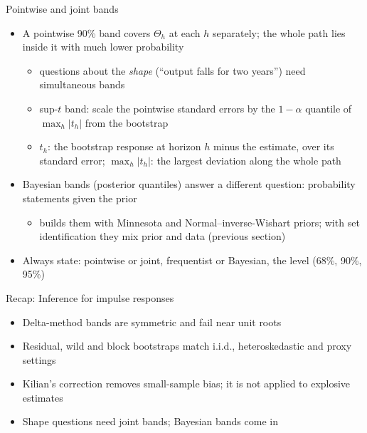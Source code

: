 \begin{frame}{Pointwise and joint bands}
\itemsize{\small}
\begin{itemize}
    \item A pointwise 90\% band covers $\Theta_h$ at each $h$ separately; the whole path lies inside it with much lower probability
    \begin{itemize}
        \item questions about the \emph{shape} (``output falls for two years'') need simultaneous bands 
        \item sup-$t$ band: scale the pointwise standard errors by the $1 - \alpha$ quantile of $\max_h|t_h|$ from the bootstrap
        \item $t_h$: the bootstrap response at horizon $h$ minus the estimate, over its standard error; $\max_h|t_h|$: the largest deviation along the whole path
    \end{itemize}
    \item Bayesian bands (posterior quantiles) answer a different question: probability statements given the prior
    \begin{itemize}
        \item {} builds them with Minnesota and Normal--inverse-Wishart priors; with set identification they mix prior and data (previous section)
    \end{itemize}
    \item Always state: pointwise or joint, frequentist or Bayesian, the level (68\%, 90\%, 95\%)
\end{itemize}
\end{frame}

\begin{frame}{Recap: Inference for impulse responses}
\itemsize{\small}
\begin{itemize}
    \item Delta-method bands are symmetric and fail near unit roots
    \item Residual, wild and block bootstraps match i.i.d., heteroskedastic and proxy settings
    \item Kilian's correction removes small-sample bias; it is not applied to explosive estimates
    \item Shape questions need joint bands; Bayesian bands come in 
\end{itemize}
\end{frame}


